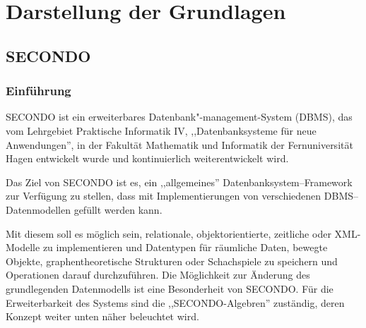 
\chapter[Darstellung der Grundlagen ]{Darstellung der Grundlagen} \label{Kapitel2}
\minitoc
\newpage
\section{SECONDO}\label{SecondoEinfuehrung}

\subsection{Einführung}
SECONDO ist ein erweiterbares Datenbank"-management-System (DBMS), das vom Lehrgebiet Praktische Informatik IV, ,,Datenbanksysteme für neue Anwendungen'', in der Fakultät Mathematik und Informatik der Fernuniversität Hagen entwickelt wurde und kontinuierlich weiterentwickelt wird.

Das Ziel von SECONDO ist es, ein ,,allgemeines'' Datenbanksystem--Framework zur Verfügung zu stellen, dass mit Implementierungen von verschiedenen DBMS--Datenmodellen gefüllt werden kann.

Mit diesem soll es möglich sein, relationale, objektorientierte, zeitliche oder XML-Modelle zu implementieren und Datentypen für räumliche Daten, bewegte Objekte, graphentheoretische Strukturen oder Schachspiele zu speichern und Operationen darauf durchzuführen. Die Möglichkeit zur Änderung des grundlegenden Datenmodells ist eine Besonderheit von SECONDO. Für die Erweiterbarkeit des Systems sind die ,,SECONDO-Algebren'' zuständig, deren Konzept weiter unten näher beleuchtet wird.

